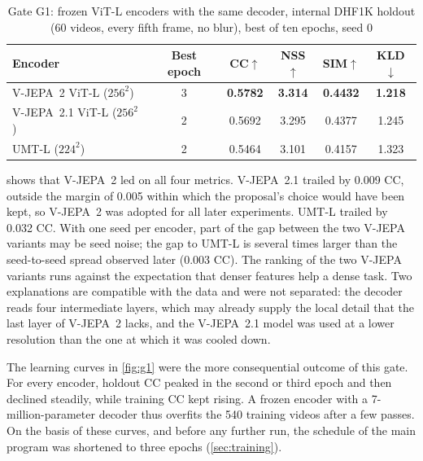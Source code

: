 \begin{table}[htbp]
  \centering
  \caption{Gate G1: frozen \acrshort{ViT}-L encoders with the same decoder, internal DHF1K
  holdout (60 videos, every fifth frame, no blur), best of ten epochs, seed 0}\label{tab:g1}
  \begin{tabular}{@{}lccccc@{}}
    \toprule
    \textbf{Encoder} & \textbf{Best epoch} & \textbf{\acrshort{CC}}$\uparrow$ & \textbf{\acrshort{NSS}}$\uparrow$
      & \textbf{\acrshort{SIM}}$\uparrow$ & \textbf{\acrshort{KLD}}$\downarrow$ \\
    \midrule
    \acrshort{V-JEPA}~2 \acrshort{ViT}-L ($256^2$)   & 3 & \textbf{0.5782} & \textbf{3.314} & \textbf{0.4432} & \textbf{1.218} \\
    \acrshort{V-JEPA}~2.1 \acrshort{ViT}-L ($256^2$) & 2 & 0.5692 & 3.295 & 0.4377 & 1.245 \\
    \acrshort{UMT}-L ($224^2$)~\cite{li2023unmasked} & 2 & 0.5464 & 3.101 & 0.4157 & 1.323 \\
    \bottomrule
  \end{tabular}
\end{table}

 shows that \acrshort{V-JEPA}~2 led on all four metrics. \acrshort{V-JEPA}~2.1 trailed by
0.009 \acrshort{CC}, outside the margin of 0.005 within which the proposal's choice would
have been kept, so \acrshort{V-JEPA}~2 was adopted for all later experiments. \acrshort{UMT}-L trailed
by 0.032 \acrshort{CC}. With one seed per encoder, part of the gap between the two
\acrshort{V-JEPA} variants may be seed noise; the gap to \acrshort{UMT}-L is several times larger
than the seed-to-seed spread observed later (0.003 \acrshort{CC}). The ranking of the two
\acrshort{V-JEPA} variants runs against the expectation that denser features help a dense
task. Two explanations are compatible with the data and were not separated:
the decoder reads four intermediate layers, which may already supply the local
detail that the last layer of \acrshort{V-JEPA}~2 lacks, and the \acrshort{V-JEPA}~2.1 model was used
at a lower resolution than the one at which it was cooled down.

The learning curves in \cref{fig:g1} were the more consequential outcome of this
gate. For every encoder, holdout \acrshort{CC} peaked in the second or third epoch and
then declined steadily, while training \acrshort{CC} kept rising. A frozen encoder with a
7-million-parameter decoder thus overfits the 540 training videos after a few
passes. On the basis of these curves, and before any further run, the schedule
of the main program was shortened to three epochs (\cref{sec:training}).

